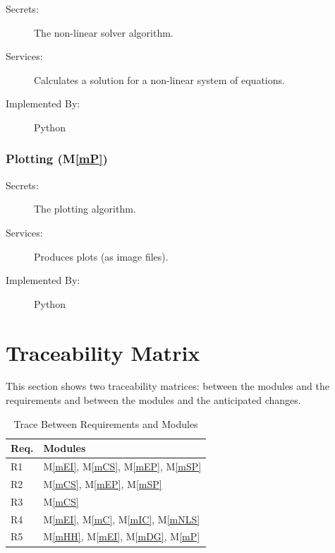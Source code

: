 \documentclass[12pt, titlepage]{article}
\newcommand{\mref}[1]{M\ref{#1}}
\begin{document}
\begin{description}
\item[Secrets:] The non-linear solver algorithm.
\item[Services:] Calculates a solution for a non-linear system of equations.
\item[Implemented By:] Python
\end{description}

\subsubsection{Plotting (\mref{mP})}

\begin{description}
\item[Secrets:] The plotting algorithm.
\item[Services:] Produces plots (as image files). 
\item[Implemented By:] Python
\end{description}

\newpage
\section{Traceability Matrix} \label{SecTM}

This section shows two traceability matrices: between the modules and the
requirements and between the modules and the anticipated changes.

\begin{table}[H]
\centering
\begin{tabular}{p{} p{}}
\toprule
\textbf{Req.} & \textbf{Modules}\\
\midrule
R1 & \mref{mEI}, \mref{mCS}, \mref{mEP}, \mref{mSP}\\
R2 & \mref{mCS}, \mref{mEP}, \mref{mSP}\\
R3 & \mref{mCS}\\
R4 & \mref{mEI}, \mref{mC}, \mref{mIC}, \mref{mNLS}\\
R5 & \mref{mHH}, \mref{mEI}, \mref{mDG}, \mref{mP}\\
\bottomrule
\end{tabular}
\caption{Trace Between Requirements and Modules}
\label{TblRT}
\end{table}
\end{document}
